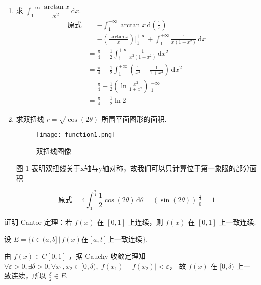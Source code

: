 \documentclass{jhwhw}
\begin{document}
\begin{enumerate}
            \item 求 $\displaystyle\int_1^{+\infty} \dfrac{\arctan x}{x^2} \,\text{d}x$.
            \solution
            \begin{align*}
                \text{原式} &= - \int_1^{+\infty} \arctan x \,\text{d}\left(\frac{1}{x}\right) \\
                            &= - \left( \frac{\arctan x}{x} \right)\bigg|_1^{+\infty} + \int_1^{+\infty} \frac{1}{x(1+x^2)} \,\text{d}x \\
                            &= \frac{\pi}{4} + \frac{1}{2} \int_1^{+\infty} \frac{1}{x^2 (1+x^2)} \,\text{d}x^2 \\
                            &= \frac{\pi}{4} + \frac{1}{2} \int_1^{+\infty} \left(\frac{1}{x^2}-\frac{1}{1+x^2} \right) \,\text{d}x^2 \\
                            &= \frac{\pi}{4} + \frac{1}{2} \left(\ln \frac{x^2}{1+x^2} \right)\bigg|_1^{+\infty} \\
                            &= \frac{\pi}{4} + \frac{1}{2} \ln 2
            \end{align*}

            \newpage

            \item 求双扭线 $r=\sqrt{\cos (2\theta)}$ 所围平面图形的面积.
            \solution
            \begin{figure}[htbp]
                \centering
                \texttt{[image: function1.png]}
                \caption{双扭线图像}
                \label{fig:function1}
            \end{figure}
            图 \ref{fig:function1} 表明双扭线关于x轴与y轴对称，故我们可以只计算位于第一象限的部分面积

            \[
                \text{原式} = 4 \int_{0}^{\frac{\pi}{4}} \frac{1}{2} \cos(2\theta) \,\text{d}\theta
                            = \left(\sin(2\theta)\right) \big|_0^{\frac{\pi}{4}}
                            = 1
            \]

        \end{enumerate}
    
    
        证明 Cantor 定理：若 $f(x)$ 在 $[0,1]$ 上连续，则 $f(x)$ 在 $[0,1]$ 上一致连续.
    \solution

    设 $E = \{ t\in (a,b] \,|\, f(x) \text{在} [a,t] \text{上一致连续} \} $.
    
    由 $f(x)\in C[0,1]$ ，据 Cauchy 收敛定理知 $\forall \varepsilon>0, \exists \delta>0, \forall x_1,x_2 \in [0,\delta), |f(x_1)-f(x_2)|<\varepsilon$，
    故 $f(x)$ 在 $[0,\delta)$ 上一致连续，所以 $\frac{\delta}{2} \in E$.
    
\end{document}
